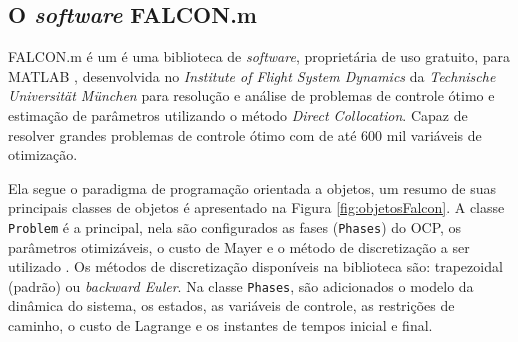\subsection{O \textit{software} FALCON.m}

FALCON.m é um é uma biblioteca de \textit{software}, proprietária de uso gratuito, para MATLAB , 
desenvolvida no \textit{Institute of Flight System Dynamics} da \textit{Technische Universit{\"a}t M{\"u}nchen} para resolução e 
análise de problemas de controle ótimo e estimação de parâmetros utilizando o método \textit{Direct Collocation}. Capaz de resolver grandes problemas de controle ótimo com de até 600 mil variáveis de otimização.\cite{manual:Falcon, phd:Rieck} 

Ela segue o paradigma de programação orientada a objetos, um resumo de suas principais classes de objetos é apresentado na Figura \ref{fig:objetosFalcon}. 
A classe \lstinline[style=Matlab-editor]{Problem} é a principal, nela são configurados as fases (\lstinline[style=Matlab-editor]{Phases}) do OCP, os parâmetros otimizáveis, o custo de Mayer e
o método de discretização a ser utilizado . Os métodos de discretização disponíveis na biblioteca são: 
trapezoidal (padrão) ou \textit{backward Euler}.  Na classe \lstinline[style=Matlab-editor]{Phases}, são adicionados o modelo da dinâmica do sistema, os estados, as variáveis 
de controle, as restrições de caminho, o custo de Lagrange e os instantes de tempos inicial e final.\cite{phd:Matthias}

